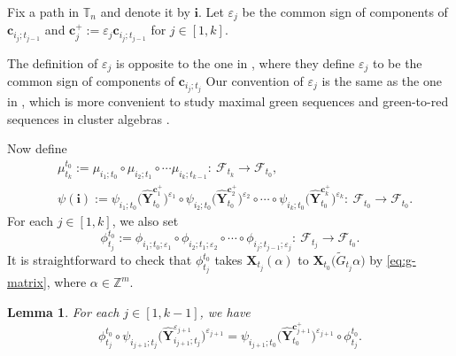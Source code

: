 \documentclass[10pt,a4paper]{amsart}
\newcommand{\Z}{\mathbb{Z}}
\numberwithin{equation}{section}
\newtheorem{Lemma}[Theorem]{Lemma}
\begin{document}
Fix a path  in $\mathbb{T}_n$ and denote it by $\mathbf{i}$. Let $\varepsilon_{j}$ be the common sign of components of $\mathbf{c}_{i_j;t_{j-1}}$ and $\mathbf{c}_{j}^{+}:=\varepsilon_{j}\mathbf{c}_{i_j;t_{j-1}}$ for $j\in[1,k]$.
\begin{Remark}
 The definition of $\varepsilon_j$ is opposite to the one in \cite{LMN2023}, where they define $\varepsilon_j$ to be the common sign of components of $\mathbf{c}_{i_j;t_j}$
 Our convention of $\varepsilon_{j}$ is the same as the one in \cite{Keller2012}, which is more convenient to study maximal green sequences and green-to-red sequences in cluster algebras \cite{KD2020}.
\end{Remark}
Now define
\begin{align*}
&\mu_{t_k}^{t_0}:=\mu_{i_1;t_0}\circ\mu_{i_2;t_1}\circ\cdots\mu_{i_k;t_{k-1}}\colon\ \mathcal{F}_{t_k}\to\mathcal{F}_{t_0},\\
&\psi(\mathbf{i}):=\psi_{i_1;t_0}\bigl(\mathbf{\hat{Y}}_{t_0}^{\mathbf{c}_{1}^+}\bigr)^{\varepsilon_1}\circ\psi_{i_2;t_0}\bigl(\mathbf{\hat{Y}}_{t_0}^{\mathbf{c}_{2}^+}\bigr)^{\varepsilon_2}\circ\cdots\circ\psi_{i_k;t_0}\bigl(\mathbf{\hat{Y}}_{t_0}^{\mathbf{c}_{k}^+}\bigr)^{\varepsilon_k}\colon\ \mathcal{F}_{t_0}\to\mathcal{F}_{t_0}.
\end{align*}
For each $j\in [1,k]$, we also set
\[
\phi_{t_{j}}^{t_0}:=\phi_{i_1;t_{0};\varepsilon_{1}}\circ\phi_{i_2;t_{1};\varepsilon_{2}}\circ\cdots\circ\phi_{i_j;t_{j-1};\varepsilon_{j}}\colon\ \mathcal{F}_{t_{j}}\to\mathcal{F}_{t_{0}}.
\]
It is straightforward to check that $\phi_{t_{j}}^{t_0}$ takes $\mathbf{X}_{t_{j}}(\alpha)$ to $\mathbf{X}_{t_{0}}\bigl(\tilde{G}_{t_{j}}\alpha\bigr)$ by \eqref{eq:g-matrix}, where $\alpha\in \Z^m$.
\begin{Lemma}\label{l:commutative-diag-isom}
 For each $j\in [1,k-1]$, we have
\[
 \phi_{t_{j}}^{t_{0}}\circ\psi_{i_{j+1};t_{j}}\bigl(\mathbf{\hat{Y}}^{\varepsilon_{j+1}}_{i_{j+1};t_{j}}\bigr)^{\varepsilon_{j+1}}
 =\psi_{i_{j+1};t_{0}}\bigl(\mathbf{\hat{Y}}_{t_{0}}^{\mathbf{c}_{j+1}^{+}}\bigr)^{\varepsilon_{j+1}}\circ\phi_{t_{j}}^{t_{0}}.
 \]
\end{Lemma}
\end{document}
